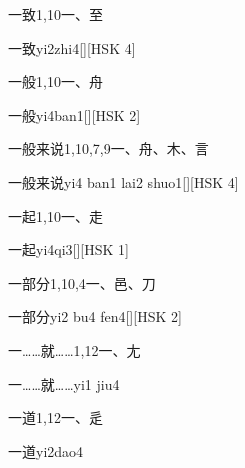 \begin{entry}{一致}{1,10}{⼀、⾄}
  \begin{phonetics}{一致}{yi2zhi4}[][HSK 4]
  \end{phonetics}
\end{entry}

\begin{entry}{一般}{1,10}{⼀、⾈}
  \begin{phonetics}{一般}{yi4ban1}[][HSK 2]
  \end{phonetics}
\end{entry}

\begin{entry}{一般来说}{1,10,7,9}{⼀、⾈、⽊、⾔}
  \begin{phonetics}{一般来说}{yi4 ban1 lai2 shuo1}[][HSK 4]
  \end{phonetics}
\end{entry}

\begin{entry}{一起}{1,10}{⼀、⾛}
  \begin{phonetics}{一起}{yi4qi3}[][HSK 1]
  \end{phonetics}
\end{entry}

\begin{entry}{一部分}{1,10,4}{⼀、⾢、⼑}
  \begin{phonetics}{一部分}{yi2 bu4 fen4}[][HSK 2]
  \end{phonetics}
\end{entry}

\begin{entry}{一……就……}{1,12}{⼀、⼪}
  \begin{phonetics}{一……就……}{yi1 jiu4}
  \end{phonetics}
\end{entry}

\begin{entry}{一道}{1,12}{⼀、⾡}
  \begin{phonetics}{一道}{yi2dao4}
  \end{phonetics}
\end{entry}

